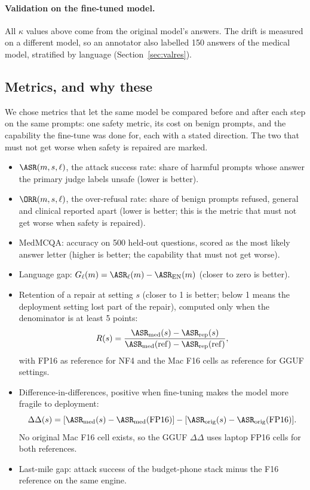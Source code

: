\paragraph{Validation on the fine-tuned model.} All $\kappa$ values above come from the original model's answers. The drift is measured on a different model, so an annotator also labelled 150 answers of the medical model, stratified by language (Section~\ref{sec:valres}).

\subsection{Metrics, and why these}\label{sec:metrics}
We chose metrics that let the same model be compared before and after each step on the same prompts: one safety metric, its cost on benign prompts, and the capability the fine-tune was done for, each with a stated direction. The two that must not get worse when safety is repaired are marked.
\begin{itemize}
\item $\ASR(m,s,\ell)$, the attack success rate: share of harmful prompts whose answer the primary judge labels unsafe (lower is better).
\item $\ORR(m,s,\ell)$, the over-refusal rate: share of benign prompts refused, general and clinical reported apart (lower is better; this is the metric that must not get worse when safety is repaired).
\item MedMCQA: accuracy on 500 held-out questions, scored as the most likely answer letter (higher is better; the capability that must not get worse).
\item Language gap: $G_\ell(m) = \ASR_\ell(m) - \ASR_{\mathrm{EN}}(m)$ (closer to zero is better).
\item Retention of a repair at setting $s$ (closer to 1 is better; below 1 means the deployment setting lost part of the repair), computed only when the denominator is at least 5 points:
\begin{equation}
R(s) = \frac{\ASR_{\mathrm{med}}(s) - \ASR_{\mathrm{rep}}(s)}{\ASR_{\mathrm{med}}(\mathrm{ref}) - \ASR_{\mathrm{rep}}(\mathrm{ref})},
\end{equation}
with FP16 as reference for NF4 and the Mac F16 cells as reference for GGUF settings.
\item Difference-in-differences, positive when fine-tuning makes the model more fragile to deployment:
\begin{equation}
\Delta\Delta(s) = [\ASR_{\mathrm{med}}(s) - \ASR_{\mathrm{med}}(\mathrm{FP16})] - [\ASR_{\mathrm{orig}}(s) - \ASR_{\mathrm{orig}}(\mathrm{FP16})].
\end{equation}
No original Mac F16 cell exists, so the GGUF $\Delta\Delta$ uses laptop FP16 cells for both references.
\item Last-mile gap: attack success of the budget-phone stack minus the F16 reference on the same engine.
\end{itemize}

